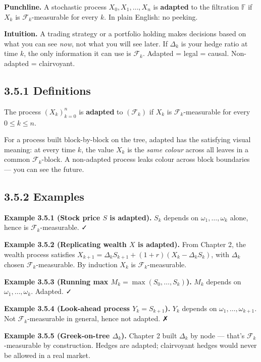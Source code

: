\documentclass[
  10pt,
  twoside]{book}
\begin{document}
\textbf{Punchline.} A stochastic process \(X_0, X_1, \ldots, X_n\) is
\textbf{adapted} to the filtration \(\mathbb F\) if \(X_k\) is
\(\mathcal F_k\)-measurable for every \(k\). In plain English: no
peeking.

\textbf{Intuition.} A trading strategy or a portfolio holding makes
decisions based on what you can see \emph{now}, not what you will see
later. If \(\Delta_k\) is your hedge ratio at time \(k\), the only
information it can use is \(\mathcal F_k\). Adapted = legal = causal.
Non-adapted = clairvoyant.

\subsection{3.5.1 Definitions}\label{definitions-10}

The process \((X_k)_{k=0}^n\) is \textbf{adapted} to \((\mathcal F_k)\)
if \(X_k\) is \(\mathcal F_k\)-measurable for every \(0 \le k \le n\).

For a process built block-by-block on the tree, adapted has the
satisfying visual meaning: at every time \(k\), the value \(X_k\) is the
\emph{same colour} across all leaves in a common \(\mathcal F_k\)-block.
A non-adapted process leaks colour across block boundaries --- you can
see the future.

\subsection{3.5.2 Examples}\label{examples-15}

\textbf{Example 3.5.1 (Stock price \(S\) is adapted).} \(S_k\) depends
on \(\omega_1, \ldots, \omega_k\) alone, hence is
\(\mathcal F_k\)-measurable. ✓

\textbf{Example 3.5.2 (Replicating wealth \(X\) is adapted).} From
Chapter 2, the wealth process satisfies
\(X_{k+1} = \Delta_k S_{k+1} + (1+r)(X_k - \Delta_k S_k)\), with
\(\Delta_k\) chosen \(\mathcal F_k\)-measurable. By induction \(X_k\) is
\(\mathcal F_k\)-measurable.

\textbf{Example 3.5.3 (Running max \(M_k = \max(S_0, \ldots, S_k)\)).}
\(M_k\) depends on \(\omega_1, \ldots, \omega_k\). Adapted. ✓

\textbf{Example 3.5.4 (Look-ahead process \(Y_k = S_{k+1}\)).} \(Y_k\)
depends on \(\omega_1, \ldots, \omega_{k+1}\). Not
\(\mathcal F_k\)-measurable in general, hence not adapted. ✗

\textbf{Example 3.5.5 (Greek-on-tree \(\Delta_k\)).} Chapter 2 built
\(\Delta_k\) by node --- that's \(\mathcal F_k\)-measurable by
construction. Hedges are adapted; clairvoyant hedges would never be
allowed in a real market.
\end{document}
